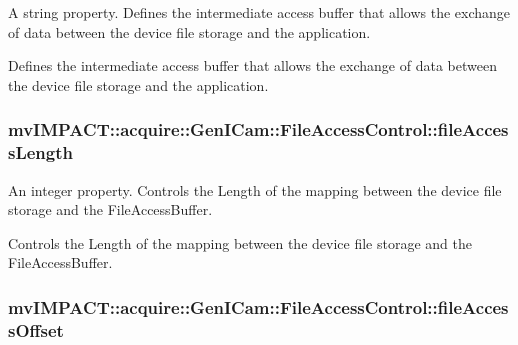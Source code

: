 A string property. Defines the intermediate access buffer that allows the exchange of data between the device file storage and the application. 

Defines the intermediate access buffer that allows the exchange of data between the device file storage and the application. \hypertarget{classmv_i_m_p_a_c_t_1_1acquire_1_1_gen_i_cam_1_1_file_access_control_a8c99b56aab262605e285f3e2b5a3ecb7}{
\subsubsection[{file\+Access\+Length}]{ mv\+I\+M\+P\+A\+C\+T\+::acquire\+::\+Gen\+I\+Cam\+::\+File\+Access\+Control\+::file\+Access\+Length}}\label{classmv_i_m_p_a_c_t_1_1acquire_1_1_gen_i_cam_1_1_file_access_control_a8c99b56aab262605e285f3e2b5a3ecb7}


An integer property. Controls the Length of the mapping between the device file storage and the File\+Access\+Buffer. 

Controls the Length of the mapping between the device file storage and the File\+Access\+Buffer. \hypertarget{classmv_i_m_p_a_c_t_1_1acquire_1_1_gen_i_cam_1_1_file_access_control_a92feefbf9e3688fd5e62e01922c8f365}{
\subsubsection[{file\+Access\+Offset}]{ mv\+I\+M\+P\+A\+C\+T\+::acquire\+::\+Gen\+I\+Cam\+::\+File\+Access\+Control\+::file\+Access\+Offset}}\label{classmv_i_m_p_a_c_t_1_1acquire_1_1_gen_i_cam_1_1_file_access_control_a92feefbf9e3688fd5e62e01922c8f365}


